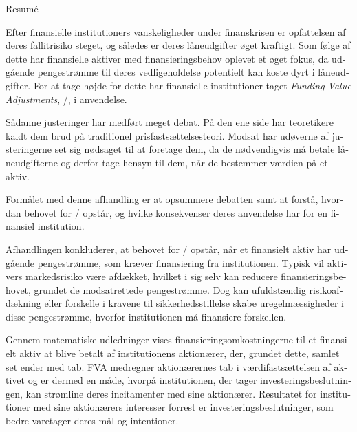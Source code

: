 \documentclass[main.tex]{subfiles}
\begin{document}
    \begin{otherlanguage}{danish}
    \thispagestyle{empty}
    \begin{center}
    {\LARGE Resumé}
    \end{center}

    Efter finansielle institutioners vanskeligheder under finanskrisen 
    er opfattelsen af deres fallitrisiko steget, og således er deres låneudgifter øget kraftigt.
    Som følge af dette har finansielle aktiver med finansieringsbehov oplevet et øget fokus, 
    da udgående pengestrømme til deres vedligeholdelse potentielt kan koste dyrt i låneudgifter.
    For at tage højde for dette har finansielle institutioner taget 
    \textit{Funding Value Adjustments}, \FVA/, i anvendelse.

    Sådanne justeringer har medført meget debat. 
    På den ene side har teoretikere kaldt dem brud på traditionel prisfastsættelsesteori.
    Modsat har udøverne af justeringerne set sig nødsaget til at foretage dem,
    da de nødvendigvis må betale låneudgifterne 
    og derfor tage hensyn til dem, når de bestemmer værdien på et aktiv. 

    Formålet med denne afhandling er at opsummere debatten
    samt at forstå, hvordan behovet for \FVA/ opstår, 
    og hvilke konsekvenser deres anvendelse har for en finansiel institution. 

    Afhandlingen konkluderer, at behovet for \FVA/ opstår, 
    når et finansielt aktiv har udgå\-ende pengestrømme, som kræver finansiering fra institutionen.
    Typisk vil aktivers markedsrisiko være afdækket,
    hvilket i sig selv kan reducere finansieringsbehovet, grundet de modsatrettede pengestrømme.
    Dog kan ufuldstændig risikoafdækning eller forskelle i kravene til sikkerhedsstillelse
    skabe uregelmæssigheder i disse pengestrømme, hvorfor institutionen må finansiere forskellen.
    
    Gennem matematiske udledninger vises finansieringsomkostningerne til et finansielt aktiv
    at blive betalt af institutionens aktionærer,
    der, grundet dette, samlet set ender med tab.
    FVA medregner aktionærernes tab i værdifastsættelsen af aktivet
    og er dermed en måde, hvorpå institutionen, der tager investeringsbeslutningen, 
    kan strømline deres incitamenter med sine aktionærer. 
    Resultatet for institutioner med sine aktionærers interesser forrest
    er investeringsbeslutninger, som bedre varetager deres mål og intentioner.
    
    \end{otherlanguage}
\end{document}
